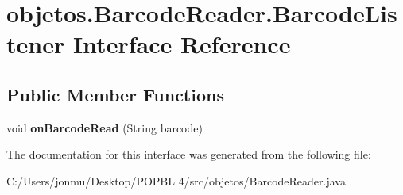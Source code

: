 \hypertarget{interfaceobjetos_1_1_barcode_reader_1_1_barcode_listener}{}\section{objetos.\+Barcode\+Reader.\+Barcode\+Listener Interface Reference}
\label{interfaceobjetos_1_1_barcode_reader_1_1_barcode_listener}
\subsection*{Public Member Functions}
\begin{DoxyCompactItemize}
\item 
\mbox{\label{interfaceobjetos_1_1_barcode_reader_1_1_barcode_listener_aca5208abcd950196a737408a2368c32f}} 
void {\bfseries on\+Barcode\+Read} (String barcode)
\end{DoxyCompactItemize}


The documentation for this interface was generated from the following file\+:\begin{DoxyCompactItemize}
\item 
C\+:/\+Users/jonmu/\+Desktop/\+P\+O\+P\+B\+L 4/src/objetos/Barcode\+Reader.\+java\end{DoxyCompactItemize}
